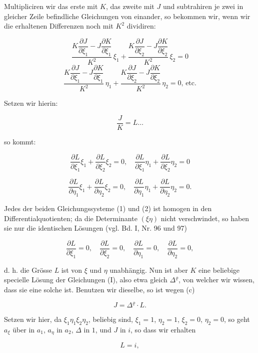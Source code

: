 \documentclass[11pt]{article}
\providecommand{\weberpage}[1]{}
\let\Delta\varDelta
\begin{document}
Multipliciren wir das erste mit $K$, das zweite mit $J$ und subtrahiren je zwei in gleicher Zeile befindliche Gleichungen von einander, so bekommen wir, wenn wir die erhaltenen Differenzen noch mit $K^2$ dividiren:

\[
\frac{K\dfrac{\partial J}{\partial \xi_1}-J\dfrac{\partial K}{\partial \xi_1}}{K^2}\,\xi_1+\frac{K\dfrac{\partial J}{\partial \xi_2}-J\dfrac{\partial K}{\partial \xi_2}}{K^2}\,\xi_2=0
\]
\[
\frac{K\dfrac{\partial J}{\partial \xi_1}-J\dfrac{\partial K}{\partial \xi_1}}{K^2}\,\eta_1+\frac{K\dfrac{\partial J}{\partial \xi_2}-J\dfrac{\partial K}{\partial \xi_2}}{K^2}\,\eta_2=0\text{, etc.}
\]

Setzen wir hierin:

\[
\frac{J}{K} = L\ldots \tag{c}
\]

so kommt:

\[
\frac{\partial L}{\partial \xi_1}\xi_1+\frac{\partial L}{\partial \xi_2}\xi_2=0,\quad \frac{\partial L}{\partial \xi_1}\eta_1+\frac{\partial L}{\partial \xi_2}\eta_2=0 \tag{1}
\]

\[
\frac{\partial L}{\partial \eta_1}\xi_1+\frac{\partial L}{\partial \eta_2}\xi_2=0,\quad \frac{\partial L}{\partial \eta_1}\eta_1+\frac{\partial L}{\partial \eta_2}\eta_2=0. \tag{2}
\]

Jedes der beiden Gleichungssysteme (1) und (2) ist homogen in den Differentialquotienten; da die Determinante $(\xi\eta)$ nicht verschwindet, so haben sie nur die identischen Lösungen (vgl. Bd. I, Nr. 96 und 97)

\[
\frac{\partial L}{\partial \xi_1}=0,\quad \frac{\partial L}{\partial \xi_2}=0,\quad \frac{\partial L}{\partial \eta_1}=0,\quad \frac{\partial L}{\partial \eta_2}=0,
\]

d. h. die Grösse $L$ ist von $\xi$ und $\eta$ unabhängig. Nun ist aber $K$ eine beliebige specielle Lösung der Gleichungen (I), also etwa gleich $\Delta^\varrho$, von welcher wir wissen, dass sie eine solche ist. Benutzen wir dieselbe, so ist wegen (c)

\[
J = \Delta^\varrho \cdot L.
\]


\weberpage{127}
Setzen wir hier, da $\xi_1\eta_1\xi_2\eta_2$, beliebig sind, $\xi_1=1$, $\eta_2=1$, $\xi_2=0$, $\eta_2=0$, so geht $a_\xi$ über in $a_1$, $a_\eta$ in $a_2$, $\Delta$ in $1$, und $J$ in $i$, so dass wir erhalten

\[
L = i,
\]
\end{document}
